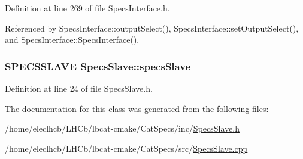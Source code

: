 Definition at line 269 of file SpecsInterface.h.

Referenced by SpecsInterface::outputSelect(), SpecsInterface::setOutputSelect(), and SpecsInterface::SpecsInterface().\hypertarget{classSpecsSlave_a98f0190d671023c3d874088ea2bd874b}{
\subsubsection[{specsSlave}]{\setlength{\rightskip}{0pt plus 5cm}SPECSSLAVE {\bf SpecsSlave::specsSlave}}}
\label{classSpecsSlave_a98f0190d671023c3d874088ea2bd874b}


Definition at line 24 of file SpecsSlave.h.

The documentation for this class was generated from the following files:\begin{DoxyCompactItemize}
\item 
/home/eleclhcb/LHCb/lbcat-\/cmake/CatSpecs/inc/\hyperlink{SpecsSlave_8h}{SpecsSlave.h}\item 
/home/eleclhcb/LHCb/lbcat-\/cmake/CatSpecs/src/\hyperlink{SpecsSlave_8cpp}{SpecsSlave.cpp}\end{DoxyCompactItemize}
